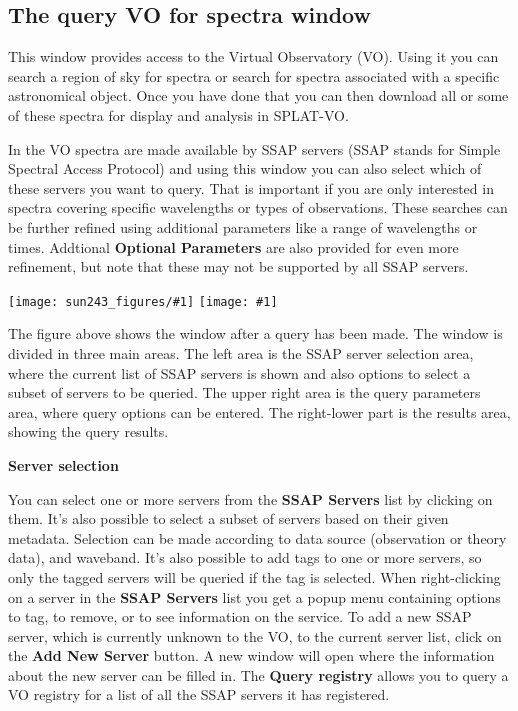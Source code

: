 \documentclass[twoside,11pt,nolof]{starlink}
\providecommand{\SPLAT}{\textsf{SPLAT-VO}}
\providecommand{\mainfigure}[1]
{\begin{center}
    \ifpdf
    \texttt{[image: sun243\_figures/\#1]}
    \else
    \texttt{[image: \#1]}
    \fi
 \end{center}
}
\newcommand{\labelitem}[1]{\textbf{#1}}
\providecommand{\subheading}[1]{\textbf{\large{#1}}}
\begin{document}
\newpage
\subsection{The query VO for spectra window{}}

This window provides access to the Virtual Observatory (VO). Using it you can
search a region of sky for spectra or search for spectra associated with a
specific astronomical object. Once you have done that you can then download
all or some of these spectra for display and analysis in \SPLAT.

In the VO spectra are made available by SSAP servers (SSAP stands for Simple
Spectral Access Protocol) and using this window you can also select which of
these servers you want to query. That is important if you are only interested
in spectra covering specific wavelengths or types of observations. These
searches can be further refined using additional parameters like a range of
wavelengths or times. Addtional \labelitem{Optional Parameters} are also
provided for even more refinement, but note that these may not be supported by all
SSAP servers.

\mainfigure{ssapwindow}

The figure above shows the window after a query has been made.  The window is
divided in three main areas.  The left area is the SSAP server selection area,
where the current list of SSAP servers is shown and also options to select a
subset of servers to be queried. The upper right area is the query parameters
area, where query options can be entered.  The right-lower part is the results
area, showing the query results.

\subheading{Server selection}

You can select one or more servers from the \labelitem{SSAP Servers} list by clicking
on them.
It's  also possible to select a subset of servers based on their given metadata. Selection can be
made according to data source (observation or theory data), and waveband.
It's also possible to add tags to one or more servers,  so only the tagged servers will be 
queried if the tag is selected.
When right-clicking on a server in the \labelitem{SSAP Servers} list you get a popup menu
containing options  to tag,  to remove, or to see information on the service.   
To add a new SSAP server, which is currently unknown to the VO, to the current
server list, click on the \labelitem{Add New Server} button. A new window will open where
the information about the new server can be filled in.  The \labelitem{Query registry} 
allows you to query a VO registry for a list of all the SSAP servers it
has registered.
\end{document}

